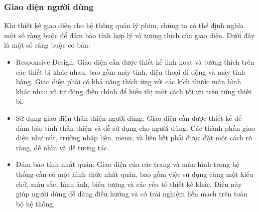 \documentclass[12pt]{article}
\begin{document}
\subsubsection{Giao diện người dùng}
Khi thiết kế giao diện cho hệ thống quản lý phim, chúng ta có thể định nghĩa một số ràng buộc để đảm bảo tính hợp lý và tương thích của giao diện. Dưới đây là một số ràng buộc cơ bản:
\begin{itemize}
    \item     Responsive Design: Giao diện cần được thiết kế linh hoạt và tương thích trên các thiết bị khác nhau, bao gồm máy tính, điện thoại di động và máy tính bảng. Giao diện phải có khả năng thích ứng với các kích thước màn hình khác nhau và tự động điều chỉnh để hiển thị một cách tối ưu trên từng thiết bị.

    \item Sử dụng giao diện thân thiện người dùng: Giao diện cần được thiết kế để đảm bảo tính thân thiện và dễ sử dụng cho người dùng. Các thành phần giao diện như nút, trường nhập liệu, menu, và liên kết phải được đặt một cách rõ ràng, dễ nhìn và dễ tương tác.

    \item Đảm bảo tính nhất quán: Giao diện của các trang và màn hình trong hệ thống cần có một hình thức nhất quán, bao gồm việc sử dụng cùng một kiểu chữ, màu sắc, hình ảnh, biểu tượng và các yếu tố thiết kế khác. Điều này giúp người dùng dễ dàng điều hướng và có trải nghiệm liền mạch trên toàn bộ hệ thống.


\end{itemize}
\end{document}
